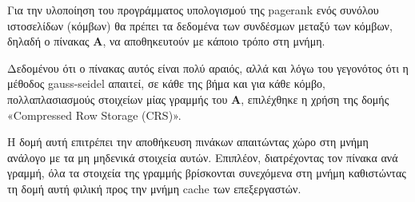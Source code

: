 Για την υλοποίηση του προγράμματος υπολογισμού της pagerank ενός συνόλου ιστοσελίδων (κόμβων) θα πρέπει τα δεδομένα των συνδέσμων μεταξύ των κόμβων, δηλαδή ο πίνακας $\bm{A}$, να αποθηκευτούν με κάποιο τρόπο στη μνήμη.

Δεδομένου ότι ο πίνακας αυτός είναι πολύ αραιός, αλλά και λόγω του γεγονότος ότι η μέθοδος gauss-seidel απαιτεί, σε κάθε της βήμα και για κάθε κόμβο, πολλαπλασιασμούς στοιχείων μίας γραμμής του $\bm{A}$, επιλέχθηκε η χρήση της δομής «Compressed Row Storage (CRS)». 

Η δομή αυτή επιτρέπει την αποθήκευση πινάκων απαιτώντας χώρο στη μνήμη ανάλογο με τα μη μηδενικά στοιχεία αυτών. Επιπλέον, διατρέχοντας τον πίνακα ανά γραμμή, όλα τα στοιχεία της γραμμής βρίσκονται συνεχόμενα στη μνήμη καθιστώντας τη δομή αυτή φιλική προς την μνήμη cache των επεξεργαστών.